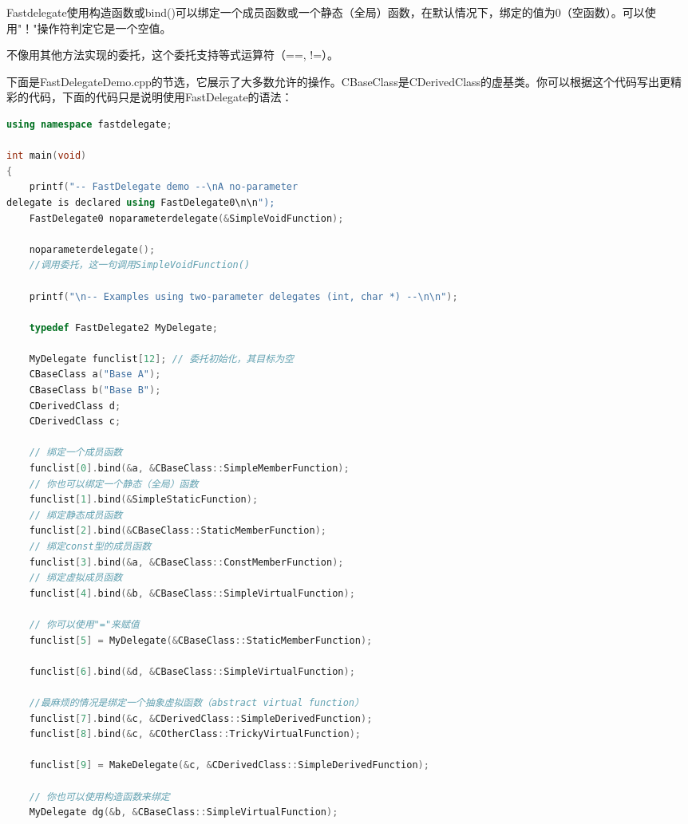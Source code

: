 \documentclass{article}
\begin{document}
\begin{CJK}{UTF8}{gbsn}
Fastdelegate使用构造函数或bind()可以绑定一个成员函数或一个静态（全局）函数，在默认情况下，绑定的值为0（空函数）。可以使用"！"操作符判定它是一个空值。

不像用其他方法实现的委托，这个委托支持等式运算符（==, !=）。

下面是FastDelegateDemo.cpp的节选，它展示了大多数允许的操作。CBaseClass是CDerivedClass的虚基类。你可以根据这个代码写出更精彩的代码，下面的代码只是说明使用FastDelegate的语法：
\begin{lstlisting}[language=c++]
using namespace fastdelegate;

int main(void)
{
    printf("-- FastDelegate demo --\nA no-parameter 
delegate is declared using FastDelegate0\n\n");
    FastDelegate0 noparameterdelegate(&SimpleVoidFunction);

    noparameterdelegate(); 
    //调用委托，这一句调用SimpleVoidFunction()

    printf("\n-- Examples using two-parameter delegates (int, char *) --\n\n");

    typedef FastDelegate2 MyDelegate;

    MyDelegate funclist[12]; // 委托初始化，其目标为空
    CBaseClass a("Base A");
    CBaseClass b("Base B");
    CDerivedClass d;
    CDerivedClass c;

    // 绑定一个成员函数
    funclist[0].bind(&a, &CBaseClass::SimpleMemberFunction);
    // 你也可以绑定一个静态（全局）函数
    funclist[1].bind(&SimpleStaticFunction);
    // 绑定静态成员函数
    funclist[2].bind(&CBaseClass::StaticMemberFunction);
    // 绑定const型的成员函数
    funclist[3].bind(&a, &CBaseClass::ConstMemberFunction);
    // 绑定虚拟成员函数
    funclist[4].bind(&b, &CBaseClass::SimpleVirtualFunction);

    // 你可以使用"="来赋值
    funclist[5] = MyDelegate(&CBaseClass::StaticMemberFunction);

    funclist[6].bind(&d, &CBaseClass::SimpleVirtualFunction);

    //最麻烦的情况是绑定一个抽象虚拟函数（abstract virtual function）
    funclist[7].bind(&c, &CDerivedClass::SimpleDerivedFunction);
    funclist[8].bind(&c, &COtherClass::TrickyVirtualFunction);

    funclist[9] = MakeDelegate(&c, &CDerivedClass::SimpleDerivedFunction);

    // 你也可以使用构造函数来绑定
    MyDelegate dg(&b, &CBaseClass::SimpleVirtualFunction);


\end{lstlisting}
\end{CJK}
\end{document}
